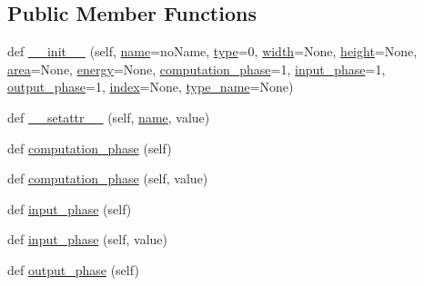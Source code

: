 \subsection*{Public Member Functions}
\begin{DoxyCompactItemize}
\item 
def \hyperlink{classsylva_1_1base_1_1fimp_1_1fimp_a2c4f614b7df71848cf53d8e11103a77e}{\+\_\+\+\_\+init\+\_\+\+\_\+} (self, \hyperlink{classsylva_1_1base_1_1fimp_1_1fimp_a29c118ec372fd4475356ec690b878e32}{name}=\textquotesingle{}no\+Name\textquotesingle{}, \hyperlink{classsylva_1_1base_1_1fimp_1_1fimp_a2a0ef56805a0a4b151421c183d7b78ca}{type}=0, \hyperlink{classsylva_1_1base_1_1fimp_1_1fimp_af63a637b7584ab0fcd1a7702e9ee9003}{width}=None, \hyperlink{classsylva_1_1base_1_1fimp_1_1fimp_a78a56a561ea60125f7d26416f0ed3130}{height}=None, \hyperlink{classsylva_1_1base_1_1fimp_1_1fimp_aba97f75ec38d4e542e7a7f5ed08056f4}{area}=None, \hyperlink{classsylva_1_1base_1_1fimp_1_1fimp_a70e3d3e9ddf525857936814218df1b4b}{energy}=None, \hyperlink{classsylva_1_1base_1_1fimp_1_1fimp_abeca9fa8599aa0b8a3dea1925d8f09b2}{computation\+\_\+phase}=1, \hyperlink{classsylva_1_1base_1_1fimp_1_1fimp_a2b18eae17590cf778d6367c1681bc3ef}{input\+\_\+phase}=1, \hyperlink{classsylva_1_1base_1_1fimp_1_1fimp_a68104c1d9ec8694b25660128fa6497a0}{output\+\_\+phase}=1, \hyperlink{classsylva_1_1base_1_1fimp_1_1fimp_a21147e520263c3af6d9ca04a4043f81c}{index}=None, \hyperlink{classsylva_1_1base_1_1fimp_1_1fimp_a0eb962cbafd47c9f28ad2859d6a64de2}{type\+\_\+name}=None)
\item 
def \hyperlink{classsylva_1_1base_1_1fimp_1_1fimp_a4668ff17373340003362fa266b97efe4}{\+\_\+\+\_\+setattr\+\_\+\+\_\+} (self, \hyperlink{classsylva_1_1base_1_1fimp_1_1fimp_a29c118ec372fd4475356ec690b878e32}{name}, value)
\item 
def \hyperlink{classsylva_1_1base_1_1fimp_1_1fimp_abeca9fa8599aa0b8a3dea1925d8f09b2}{computation\+\_\+phase} (self)
\item 
def \hyperlink{classsylva_1_1base_1_1fimp_1_1fimp_a92fa2219d6caa3808d89a8d0a5734a7b}{computation\+\_\+phase} (self, value)
\item 
def \hyperlink{classsylva_1_1base_1_1fimp_1_1fimp_a2b18eae17590cf778d6367c1681bc3ef}{input\+\_\+phase} (self)
\item 
def \hyperlink{classsylva_1_1base_1_1fimp_1_1fimp_a5c9f966e5bc0ac0f2da666d53caae1ac}{input\+\_\+phase} (self, value)
\item 
def \hyperlink{classsylva_1_1base_1_1fimp_1_1fimp_a68104c1d9ec8694b25660128fa6497a0}{output\+\_\+phase} (self)

\end{DoxyCompactItemize}
